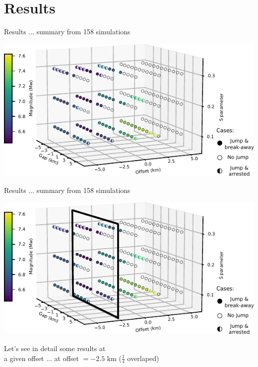 \documentclass{beamer}
\begin{document}
\section{Results}


\begin{frame}
 {Results ... summary from 158 simulations}
 
 \vskip -0.5cm
  \includegraphics[width=1\linewidth]{images/tests_shmax340}
 
\end{frame}

\begin{frame}
 {Results ... summary from 158 simulations}

  \vskip 0.5cm
  \includegraphics[width=1\linewidth]{images/tests_shmax340_1plane}
  
  \begin{center}
   Let's see in detail some results at \\
   a given offset ... at offset $=-2.5$ km ($\frac{1}{4}$ overlaped) 
  \end{center}

  
   \addtocounter{framenumber}{-1}

\end{frame}
\end{document}
